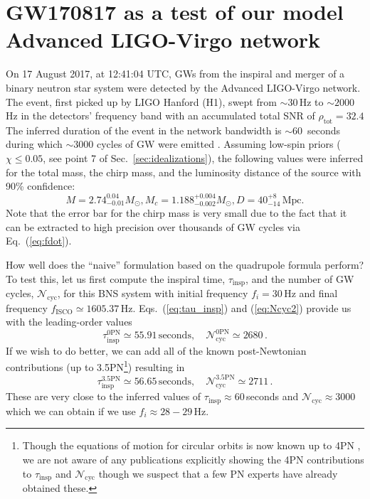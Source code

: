 \documentclass[11pt,a4paper]{article}
\newcommand{\be}{\begin{equation}}
\newcommand{\ee}{\end{equation}}
\begin{document}
\section{GW170817 as a test of our model Advanced LIGO-Virgo network}\label{Sec:GW170817}
On 17 August 2017, at 12:41:04 UTC, GWs from the inspiral and merger of a binary neutron star system were detected by the Advanced LIGO-Virgo network.
The event, first picked up by LIGO Hanford (H1), swept from $\sim 30\,$Hz to $\sim 2000\,$Hz in the detectors' frequency band with an accumulated total SNR of
$\rho_\text{tot} = 32.4$ \cite{GW170817}
The inferred duration of the event in the network bandwidth is $\sim 60\,$ seconds during which $\sim 3000$ cycles of GW were emitted \cite{GW170817_Facts}.
Assuming low-spin priors  ($\chi \le 0.05$, see point 7 of Sec.~\ref{sec:idealizations}), the following values were inferred for the total mass, the chirp mass,
and the luminosity distance of the source with 90\% confidence:
%
\be
M = 2.74^{0.04}_{-0.01} M_\odot, M_c = 1.188^{+0.004}_{-0.002} M_\odot, D= 40^{+8}_{-14}\,\text{Mpc}. \label{eq:GW170817_params}
\ee
%
Note that the error bar for the chirp mass is very small
due to the fact that it can be extracted to high precision over thousands of GW cycles via Eq.~(\ref{eq:fdot}).

How well does the ``naive'' formulation based on the quadrupole formula perform? 
To test this, let us first compute the inspiral time, $\tau_\text{insp}$, and the number of GW cycles, $\mathcal{N}_\text{cyc}$, for this BNS system with initial frequency $f_i=30\,$Hz and final frequency $f_\text{ISCO} \simeq 1605.37\,$Hz. 
Eqs.~(\ref{eq:tau_insp}) and (\ref{eq:Ncyc2}) provide us with the leading-order values
%
\be
\tau_\text{insp}^{0\text{PN}} \simeq 55.91\,\text{seconds}, \quad \mathcal{N}_\text{cyc}^{0\text{PN}} \simeq 2680\,\label{eq:GW170817_values_0PN}. 
\ee
%
If we wish to do better, we can add all of the known post-Newtonian contributions 
(up to 3.5PN\footnote{Though the equations of motion for circular orbits is now known up to 4PN \cite{4PN_EoM_paper}, we are not aware of any publications
explicitly showing the 4PN contributions to $\tau_\text{insp}$ and $\mathcal{N}_\text{cyc}$ though we suspect that a few PN experts have already obtained these.}) resulting in
%
\be
\tau_\text{insp}^{3.5\text{PN}} \simeq 56.65\,\text{seconds}, \quad \mathcal{N}_\text{cyc}^{3.5\text{PN}} \simeq 2711 \label{eq:GW170817_values_3p5PN}\, .
\ee
%
These are very close to the inferred values of $\tau_\text{insp}\approx 60$\,seconds and $\mathcal{N}_\text{cyc} \approx 3000$ which we can obtain if we use $f_i \approx 28-29\,$Hz.
\end{document}
